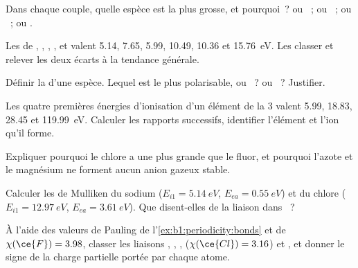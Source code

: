 \begin{exercise}[$\star$]\label{exo:b1:periodicity:2}
Dans chaque couple, quelle espèce est la plus grosse, et pourquoi~?
 ou ~;  ou ~;  ou ~;  ou .
\end{exercise}

\begin{exercise}[$\star$]\label{exo:b1:periodicity:3}
Les  de , , , ,
 et  valent 5.14, 7.65, 5.99, 10.49, 10.36 et
\qty{15.76}{eV}. Les classer et relever les deux écarts à la tendance
générale.
\end{exercise}

\begin{exercise}[$\star$]\label{exo:b1:periodicity:4}
Définir la  d'une espèce. Lequel est le plus polarisable,
 ou ~?  ou ~? Justifier.
\end{exercise}

\begin{exercise}[$\star\star$]\label{exo:b1:periodicity:5}
Les quatre premières énergies d'ionisation d'un élément de la  3
valent 5.99, 18.83, 28.45 et \qty{119.99}{eV}. Calculer les rapports
successifs, identifier l'élément et l'ion qu'il forme.
\end{exercise}

\begin{exercise}[$\star\star$]\label{exo:b1:periodicity:6}
Expliquer pourquoi le chlore a une  plus grande que
le fluor, et pourquoi l'azote et le magnésium ne forment aucun anion
gazeux stable.
\end{exercise}

\begin{exercise}[$\star\star$]\label{exo:b1:periodicity:7}
Calculer les  de Mulliken du sodium ($E_{i1} =
\qty{5.14}{eV}$, $E_{ea} = \qty{0.55}{eV}$) et du chlore ($E_{i1} =
\qty{12.97}{eV}$, $E_{ea} = \qty{3.61}{eV}$). Que disent-elles de la
liaison dans ~?
\end{exercise}

\begin{exercise}[$\star\star$]\label{exo:b1:periodicity:8}
À l'aide des valeurs de Pauling de l'\cref{ex:b1:periodicity:bonds} et
de $\chi(\ce{F})
= 3.98$, classer les liaisons , , , 
($\chi(\ce{Cl}) = 3.16$) et , et donner le signe de la charge
partielle portée par chaque atome.
\end{exercise}

